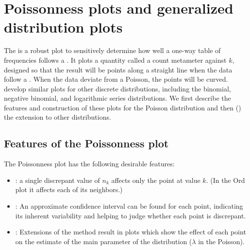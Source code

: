 \documentclass[11pt]{book}\usepackage[]{graphicx}\usepackage[]{color}
\begin{document}


\section{Poissonness plots and generalized distribution plots}\label{sec:discrete-Poissonness}


The 
\citep{Hoaglin:80}
is a robust plot to sensitively determine how well a 
one-way table of frequencies follows a .
It plots a quantity called a count metameter
against \(k\), designed
so that the result will be points along a
straight line when the data follow a .  When the
data deviate from a Poisson, the points will be curved.
\citet{HoaglinTukey:85}
develop similar plots for other discrete distributions,
including the binomial, negative binomial, and logarithmic series
distributions.  We first describe the features and construction
of these plots for the Poisson distribution and then ()
the extension to other distributions.



\subsection{Features of the Poissonness plot}
The Poissonness plot has the following desirable features:
\begin{itemize}
\item {}: a single discrepant value of \(n_k\)
       affects only the point at value \(k\).  (In the Ord plot
       it affects each of its neighbors.)
\item {}:  An approximate confidence
       interval can be found for each point, indicating its inherent
       variability and helping to judge whether each point is
       discrepant.
\item {}:  Extensions of the method result in
       plots which show the effect of each point on the estimate of
       the main parameter of the distribution (\(\lambda\) in the
       Poisson).
\end{itemize}
\end{document}
